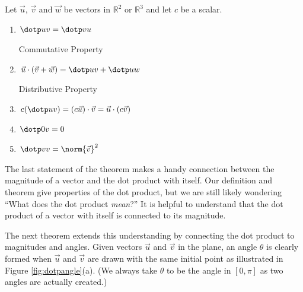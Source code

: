 {Let $\vec u$, $\vec v$ and $\vec w$ be vectors in $\mathbb{R}^2$ or $\mathbb{R}^3$ and let $c$ be a scalar.
\begin{enumerate}
	\item \parbox{150pt}{$\dotp uv = \dotp vu$}{Commutative Property}
	\item \parbox{150pt}{$\vec u\cdot(\vec v+\vec w) = \dotp uv + \dotp uw$}{Distributive Property}
	\item	$c(\dotp uv) = (c\vec u)\cdot \vec v = \vec u \cdot (c\vec v)$
	\item	$\dotp 0v = 0$
	\item	$\dotp vv=\norm{\vec v}^2 $
\end{enumerate}
}

The last statement of the theorem makes a handy connection between the magnitude of a vector and the dot product with itself. 
Our definition and theorem give properties of the dot product, but we are still likely wondering ``What does the dot product \emph{mean}?'' It is helpful to understand that the dot product of a vector with itself is connected to its magnitude.

The next theorem extends this understanding by connecting the dot product to magnitudes and angles. Given vectors $\vec u$ and $\vec v$ in the plane, an angle $\theta$ is clearly formed when $\vec u$ and $\vec v$ are drawn with the same initial point as illustrated in Figure \ref{fig:dotpangle}(a). (We always take $\theta$ to be the angle in $[0,\pi]$ as two angles are actually created.) 

